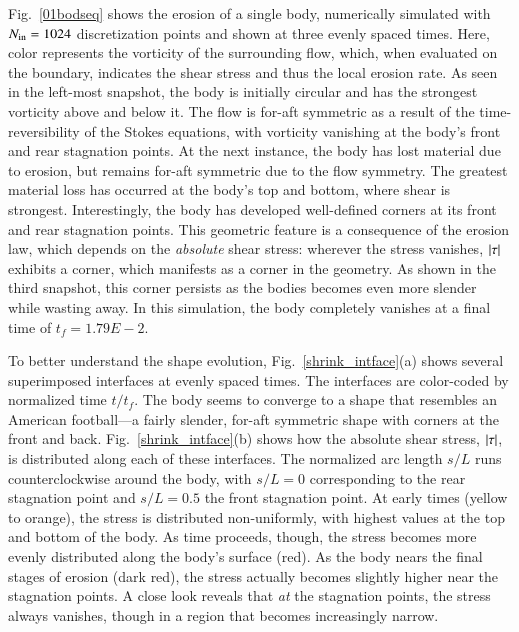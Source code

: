 \documentclass[preprint, 10pt]{elsarticle}
\begin{document}
Fig.~\ref{01bodseq} shows the erosion of a single body, numerically
simulated with $N_{\mathrm{in}} = 1024$ discretization points and shown at three
evenly spaced times. Here, color represents the vorticity of the
surrounding flow, which, when evaluated on the boundary, indicates the
shear stress and thus the local erosion rate. As seen in the left-most
snapshot, the body is initially circular and has the strongest vorticity
above and below it. The flow is for-aft symmetric as a result of the
time-reversibility of the Stokes equations, with vorticity vanishing at
the body's front and rear stagnation points. At the next instance, the
body has lost material due to erosion, but remains for-aft symmetric due
to the flow symmetry. The greatest material loss has occurred at the
body's top and bottom, where shear is strongest. Interestingly, the body
has developed well-defined corners at its front and rear stagnation
points. This geometric feature is a consequence of the erosion law,
which depends on the {\em absolute} shear stress: wherever the stress
vanishes, $\lvert \tau \rvert$ exhibits a corner, which manifests as a corner in the
geometry. As shown in the third snapshot, this corner persists as the
bodies becomes even more slender while wasting away. In this simulation,
the body completely vanishes at a final time of $t_f = 1.79E-2$.

To better understand the shape evolution, Fig.~\ref{shrink_intface}(a)
shows several superimposed interfaces at evenly spaced times. The
interfaces are color-coded by normalized time $t/t_f$. The body seems to
converge to a shape that resembles an American football---a fairly
slender, for-aft symmetric shape with corners at the front and back.
Fig.~\ref{shrink_intface}(b) shows how the absolute shear stress,
$\lvert \tau \rvert$, is distributed along each of these interfaces. The normalized
arc length $s/L$ runs counterclockwise around the body, with $s/L = 0$
corresponding to the rear stagnation point and $s/L = 0.5$ the front
stagnation point. At early times (yellow to orange), the stress is
distributed non-uniformly, with highest values at the top and bottom of
the body. As time proceeds, though, the stress becomes more evenly
distributed along the body's surface (red). As the body nears the final
stages of erosion (dark red), the stress actually becomes slightly
higher near the stagnation points. A close look reveals that {\em at}
the stagnation points, the stress always vanishes, though in a region
that becomes increasingly narrow.
\end{document}
